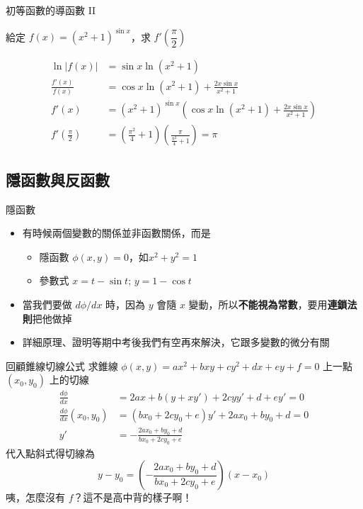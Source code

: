 \documentclass{beamer}
\begin{document}
\begin{CJK}{UTF8}{bsmi}
\begin{frame}{初等函數的導函數 II}
  \begin{example}
    給定 $f(x) = \left( x^2 + 1 \right)^{\sin x}$，求 $f'\left( \dfrac\pi2 \right)$
    \begin{solution}
      \begin{align*}
	\ln |f(x)| &= \sin x \ln \left( x^2 + 1 \right)\\
	\frac{f'(x)}{f(x)} &= \cos x \ln \left( x^2 + 1 \right) + \frac{2x \sin x}{x^2 + 1}\\
	f'(x) &= \left( x^2 + 1 \right)^{\sin x} \left( \cos x \ln \left( x^2 + 1 \right) + \frac{2x \sin x}{x^2 + 1} \right)\\
	f'\left( \frac\pi2 \right) &= \left( \frac{\pi^2}{4} + 1 \right) \left( \frac\pi{\frac{\pi^2}4 + 1} \right) = \pi
      \end{align*}
    \end{solution}
  \end{example}
\end{frame}

\subsection{隱函數與反函數}
\begin{frame}{隱函數}
  \begin{itemize}
    \item 有時候兩個變數的關係並非函數關係，而是
      \begin{itemize}
	\item 隱函數 $\phi(x,y) = 0$，如$x^2 + y^2 = 1$
	\item 參數式 $x = t - \sin t;\, y = 1 - \cos t$
      \end{itemize}
    \item 當我們要做 $d\phi/dx$ 時，因為 $y$ 會隨 $x$ 變動，所以\textbf{不能視為常數}，要用\textbf{連鎖法則}把他做掉
    \item 詳細原理、證明等期中考後我們有空再來解決，它跟多變數的微分有關
  \end{itemize}
\end{frame}

\begin{frame}[allowframebreaks]{回顧錐線切線公式}
  求錐線 $\phi(x,y) = ax^2 + bxy + cy^2 + dx + ey + f = 0$ 上一點 $(x_0, y_0)$ 上的切線
  \begin{align*}
    \frac{d\phi}{dx} &= 2ax + b \left( y+xy' \right) + 2cyy' + d + ey' = 0\\
    \frac{d\phi}{dx}(x_0, y_0) &= \left( b x_0 + 2c y_0 + e \right) y' + 2a x_0 + b y_0 + d = 0\\
    y' &= -\frac{2a x_0 + b y_0 + d}{b x_0 + 2c y_0 + e}
  \end{align*}
  代入點斜式得切線為
  \[y - y_0 = \left( -\frac{2a x_0 + b y_0 + d}{b x_0 + 2c y_0 + e} \right) (x - x_0)\]
  咦，怎麼沒有 $f$？這不是高中背的樣子啊！


\end{frame}
\end{CJK}
\end{document}
